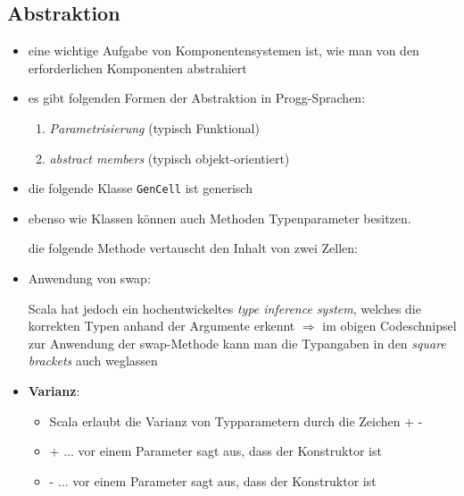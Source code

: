 \subsection{Abstraktion}
\begin{itemize}
  \item eine wichtige Aufgabe von Komponentensystemen ist, wie man von den
  erforderlichen Komponenten abstrahiert
  \item es gibt folgenden Formen der Abstraktion in Progg-Sprachen:
  \begin{enumerate}
    \item \textit{Parametrisierung} (typisch Funktional)
    \item \textit{abstract members} (typisch objekt-orientiert)
  \end{enumerate}

  \item die folgende Klasse \texttt{GenCell} ist generisch
  
  
  
  \item ebenso wie Klassen können auch Methoden Typenparameter besitzen.
  
  die folgende Methode vertauscht den Inhalt von zwei Zellen:
  
  
  
  \item Anwendung von swap:
  
  
  
  Scala hat jedoch ein hochentwickeltes \textit{type inference system}, welches
  die korrekten Typen anhand der Argumente erkennt $\Rightarrow$ im obigen 
  Codeschnipsel zur Anwendung der swap-Methode kann man die Typangaben in den
  \textit{square brackets} auch weglassen
  \item \textbf{Varianz}: 
  \begin{itemize}
    \item Scala erlaubt die Varianz von Typparametern durch die Zeichen + \und 
    -
    \item + $\ldots$ vor einem Parameter sagt aus, dass der Konstruktor
     ist
    \item - $\ldots$ vor einem Parameter sagt aus, dass der Konstruktor
     ist
  \end{itemize}
\end{itemize}


